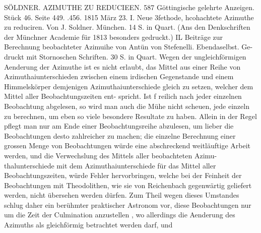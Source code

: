 \documentclass[12pt,a4paper]{article}
\begin{document}
\newpage
SÖLDNER. AZIMUTHE ZU REDUCIEEN. 587\newline
Göttingische gelehrte Anzeigen. Stück 46. Seite 449. .456. 1815 März 23.\newline
I. Neue 3fethode, hcohachtete Azimuthe zu reduciren. Von J. Soldner. München. 14 S. in Quart.\newline
(Ans den Denkschriften der Münchner Academie für 1813 besonders gedruckt.)\newline
IL Beiträge zur Berechnung beobachteter Azimuihe von Antün von Stefenelli. Ebendaselbst. Ge-\newline
druckt mit Stornoschen Schriften. 30 S. in Quart.\newline
Wegen der ungleichförmigen Aenderung der Azimuthe ist es nicht erlaubt, das Mittel aus einer\newline
Reihe von Azimuthaiunterschieden zwischen einem irdischen Gegenstande und einem Himmelskörper\newline
demjenigen Azimuthaiunterschiede gleich zu setzen, welcher dem Mittel aller Beobachtungszeiten ent-\newline
spricht. Ist f reilich nach jeder einzelnen Beobachtung abgelesen, so wird man auch die Mühe nicht\newline
scheuen, jede einzeln zu berechnen, um eben so viele besondere Resultate zu haben. Allein in der\newline
Regel pflegt man nur am Ende einer Beobachtungsreihe abzulesen, um lieber die Beobachtungen desto\newline
zahlreicher zu machen; die einzelne Berechnung einer grossen Menge von Beobachtungen würde eine\newline
abschreckend weitläuftige Arbeit werden, und die Verwechslung des Mittels aller beobachteten Azimu-\newline
thalunterschiede mit dem Azimuthaiunterschiede für das Mittel aller Beobachtungszeiten, würde Fehler\newline
hervorbringen, welche bei der Feinheit der Beobachtungen mit Theodolithen, wie sie von Reichenbach\newline
gegenwärtig geliefert werden, nicht übersehen werden dürfen. Zum Theil wegen dieses Umstandes schlug\newline
daher ein berühmter praktischer Astronom vor, diese Beobachtungen nur um die Zeit der Culmination\newline
anzustellen , wo allerdings die Aenderung des Azimuths als gleichförmig betrachtet werden darf, und\newline
\end{document}
